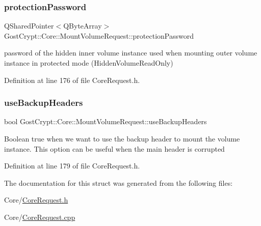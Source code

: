 \subsubsection{\texorpdfstring{protection\+Password}{protectionPassword}}
{\footnotesize\ttfamily Q\+Shared\+Pointer$<$Q\+Byte\+Array$>$ Gost\+Crypt\+::\+Core\+::\+Mount\+Volume\+Request\+::protection\+Password}

password of the hidden inner volume instance used when mounting outer volume instance in protected mode (Hidden\+Volume\+Read\+Only) 

Definition at line 176 of file Core\+Request.\+h.

\mbox{\label{struct_gost_crypt_1_1_core_1_1_mount_volume_request_a0b0879ac3e44a8ae73f03f041a278cb5}} 
\subsubsection{\texorpdfstring{use\+Backup\+Headers}{useBackupHeaders}}
{\footnotesize\ttfamily bool Gost\+Crypt\+::\+Core\+::\+Mount\+Volume\+Request\+::use\+Backup\+Headers}

Boolean true when we want to use the backup header to mount the volume instance. This option can be useful when the main header is corrupted 

Definition at line 179 of file Core\+Request.\+h.



The documentation for this struct was generated from the following files\+:\begin{DoxyCompactItemize}
\item 
Core/\hyperlink{_core_request_8h}{Core\+Request.\+h}\item 
Core/\hyperlink{_core_request_8cpp}{Core\+Request.\+cpp}\end{DoxyCompactItemize}
